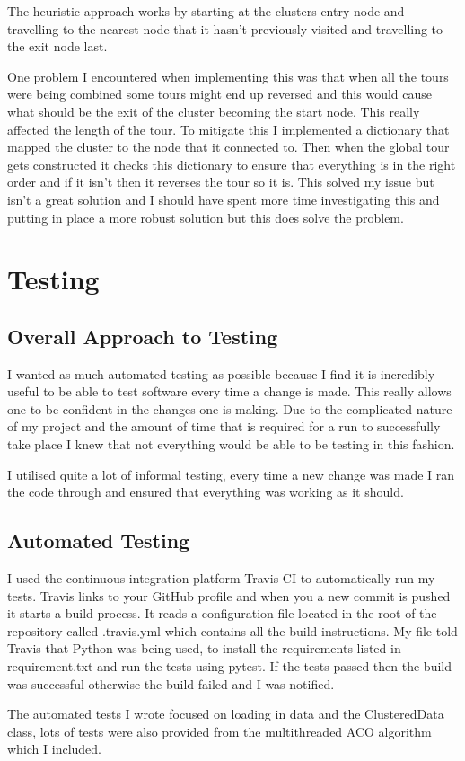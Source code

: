 The heuristic approach works by starting at the clusters entry node and travelling to the nearest node that it hasn't previously visited and travelling to the exit node last.

One problem I encountered when implementing this was that when all the tours were being combined some tours might end up reversed and this would cause what should be the exit of the cluster becoming the start node. This really affected the length of the tour. To mitigate this I implemented a dictionary that mapped the cluster to the node that it connected to. Then when the global tour gets constructed it checks this dictionary to ensure that everything is in the right order and if it isn't then it reverses the tour so it is. This solved my issue but isn't a great solution and I should have spent more time investigating this and putting in place a more robust solution but this does solve the problem.  

\section{Testing}


\subsection{Overall Approach to Testing}

I wanted as much automated testing as possible because I find it is incredibly useful to be able to test software every time a change is made. This really allows one to be confident in the changes one is making. Due to the complicated nature of my project and the amount of time that is required for a run to successfully take place I knew that not everything would be able to be testing in this fashion.

I utilised quite a lot of informal testing, every time a new change was made I ran the code through and ensured that everything was working as it should.

\subsection{Automated Testing}

I used the continuous integration platform Travis-CI\cite{travis_ci} to automatically run my tests. Travis links to your GitHub profile and when you a new commit is pushed it starts a build process. It reads a configuration file located in the root of the repository called .travis.yml which contains all the build instructions. My file told Travis that Python was being used, to install the requirements listed in requirement.txt and run the tests using pytest. If the tests passed then the build was successful otherwise the build failed and I was notified. 

The automated tests I wrote focused on loading in data and the ClusteredData class, lots of tests were also provided from the multithreaded ACO algorithm which I included.

